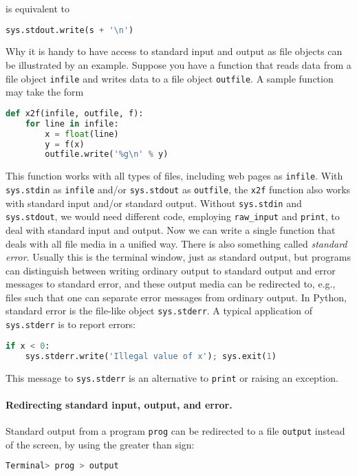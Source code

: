 \documentclass[graybox,sectrefs,envcountresetchap,open=right,final]{svmonodo}
\begin{document}
is equivalent to
\begin{lstlisting}[language=Python,style=simple,xleftmargin=2mm]
sys.stdout.write(s + '\n')

\end{lstlisting}

Why it is handy to have access to standard input and output
as file objects can be illustrated by an example. Suppose you have a
function that reads data from a file object \texttt{infile}
and writes data to a file object \texttt{outfile}.
A sample function may take the form
\begin{lstlisting}[language=Python,style=simple,xleftmargin=2mm]
def x2f(infile, outfile, f):
    for line in infile:
        x = float(line)
        y = f(x)
        outfile.write('%g\n' % y)

\end{lstlisting}

This function works with all types of files, including
web pages as \texttt{infile}.
With \texttt{sys.stdin} as \texttt{infile} and/or \texttt{sys.stdout}
as \texttt{outfile}, the \texttt{x2f} function also works with standard input
and/or standard output. Without \texttt{sys.stdin} and \texttt{sys.stdout},
we would need different code, employing \Verb!raw_input!
and \texttt{print},
to deal with standard input and output. Now we can write a single
function that deals with all file media in a unified way.
There is also something called \emph{standard error}.
Usually this is the terminal window, just as standard output, but
programs can distinguish between writing ordinary output to standard
output and error messages to standard error, and these output media
can be redirected to, e.g., files such that one can separate
error messages from ordinary output.
In Python, standard error is the file-like object \texttt{sys.stderr}.
A typical application of \texttt{sys.stderr} is to report errors:
\begin{lstlisting}[language=Python,style=simple,xleftmargin=2mm]
if x < 0:
    sys.stderr.write('Illegal value of x'); sys.exit(1)

\end{lstlisting}

This message to \texttt{sys.stderr} is an alternative to
\texttt{print} or raising an exception.
\paragraph{Redirecting standard input, output, and error.}
Standard output from a program \texttt{prog}
can be redirected to a file
\texttt{output} instead of the screen, by
using the greater than sign:
\begin{lstlisting}[language=bash,style=simple,xleftmargin=2mm]
Terminal> prog > output

\end{lstlisting}
\end{document}
